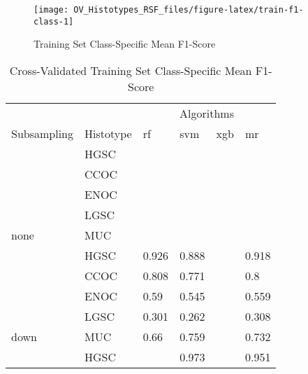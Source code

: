 \documentclass[
]{report}
\begin{document}
\begin{figure}[H]

{\centering \texttt{[image: OV\_Histotypes\_RSF\_files/figure-latex/train-f1-class-1]} 

}

\caption{Training Set Class-Specific Mean F1-Score}\label{fig:train-f1-class}
\end{figure}

\begin{table}

\caption{\label{tab:train-f1-class-table}Cross-Validated Training Set Class-Specific Mean F1-Score}
\centering
\begin{tabular}[t]{l|l|l|l|l|l}
\hline
\multicolumn{2}{c|}{ } & \multicolumn{4}{c}{Algorithms} \\
\cline{3-6}
Subsampling & Histotype & rf & svm & xgb & mr\\
\hline
 & HGSC & \cellcolor[HTML]{FF0000}{0.962} & \cellcolor[HTML]{FFD700}{0.972} & \cellcolor[HTML]{FF0000}{0.897} & \cellcolor[HTML]{FF0000}{0.897}\\
\cline{2-6}
 & CCOC & \cellcolor[HTML]{FF0000}{0.852} & \cellcolor[HTML]{FFD700}{0.858} & \cellcolor[HTML]{FF0000}{NaN} & \cellcolor[HTML]{FF0000}{0.154}\\
\cline{2-6}
 & ENOC & \cellcolor[HTML]{FF0000}{0.497} & \cellcolor[HTML]{FFD700}{0.719} & \cellcolor[HTML]{FF0000}{NaN} & \cellcolor[HTML]{FF0000}{NaN}\\
\cline{2-6}
 & LGSC & \cellcolor[HTML]{FF0000}{NaN} & \cellcolor[HTML]{FFD700}{0.375} & \cellcolor[HTML]{FF0000}{NaN} & \cellcolor[HTML]{FF0000}{NaN}\\
\cline{2-6}
\multirow{-5}{*}{\raggedright\arraybackslash none} & MUC & \cellcolor[HTML]{FF0000}{0.839} & \cellcolor[HTML]{FFD700}{0.811} & \cellcolor[HTML]{FF0000}{NaN} & \cellcolor[HTML]{FF0000}{NaN}\\
\cline{1-6}
 & HGSC & 0.926 & 0.888 & \cellcolor[HTML]{FF0000}{0.894} & 0.918\\
\cline{2-6}
 & CCOC & 0.808 & 0.771 & \cellcolor[HTML]{FF0000}{NaN} & 0.8\\
\cline{2-6}
 & ENOC & 0.59 & 0.545 & \cellcolor[HTML]{FF0000}{NaN} & 0.559\\
\cline{2-6}
 & LGSC & 0.301 & 0.262 & \cellcolor[HTML]{FF0000}{0.035} & 0.308\\
\cline{2-6}
\multirow{-5}{*}{\raggedright\arraybackslash down} & MUC & 0.66 & 0.759 & \cellcolor[HTML]{FF0000}{0.096} & 0.732\\
\cline{1-6}
 & HGSC & \cellcolor[HTML]{FFD700}{0.976} & 0.973 & \cellcolor[HTML]{FFD700}{0.976} & 0.951\\

\end{tabular}
\end{table}
\end{document}
